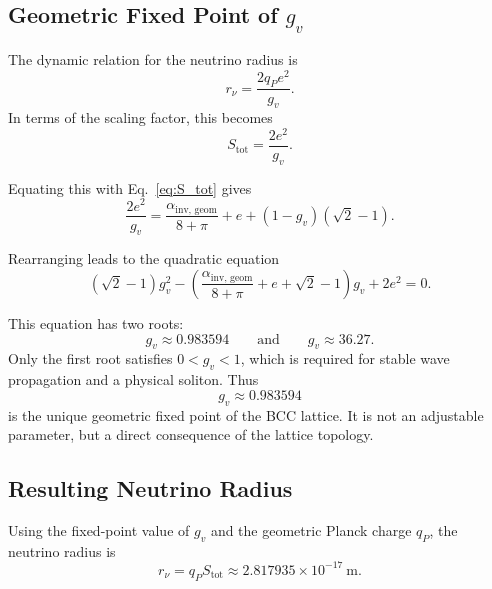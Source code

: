 \documentclass[10pt,a4paper]{article}
\begin{document}
\subsection{Geometric Fixed Point of \(g_v\)}
\label{sec:gv_fixed_point}

The dynamic relation for the neutrino radius is
\begin{equation}
	r_\nu = \frac{2 q_P e^2}{g_v}.
\end{equation}
In terms of the scaling factor, this becomes
\begin{equation}
	S_{\text{tot}} = \frac{2 e^2}{g_v}.
\end{equation}

Equating this with Eq.~\eqref{eq:S_tot} gives
\begin{equation}
	\frac{2 e^2}{g_v}
	=
	\frac{\alpha_{\text{inv, geom}}}{8 + \pi}
	+
	e
	+
	(1 - g_v)(\sqrt{2} - 1).
\end{equation}

Rearranging leads to the quadratic equation
\begin{equation}
	(\sqrt{2} - 1) g_v^2
	-
	\left(
	\frac{\alpha_{\text{inv, geom}}}{8 + \pi}
	+
	e
	+
	\sqrt{2}
	-
	1
	\right) g_v
	+
	2 e^2
	=
	0 .
	\label{eq:gv_quadratic}
\end{equation}

This equation has two roots:
\begin{equation}
	g_v \approx 0.983594
	\qquad\text{and}\qquad
	g_v \approx 36.27 .
\end{equation}
Only the first root satisfies \(0 < g_v < 1\), which is required for stable wave propagation and a physical soliton. Thus
\begin{equation}
	g_v \approx 0.983594
	\label{eq:gv_value}
\end{equation}
is the unique geometric fixed point of the BCC lattice. It is not an adjustable parameter, but a direct consequence of the lattice topology.

\subsection{Resulting Neutrino Radius}
\label{sec:r_nu_result}

Using the fixed-point value of \(g_v\) and the geometric Planck charge \(q_P\), the neutrino radius is
\begin{equation}
	r_\nu = q_P S_{\text{tot}}
	\approx
	2.817935 \times 10^{-17}\ \text{m}.
	\label{eq:r_nu_geom}
\end{equation}
\end{document}
